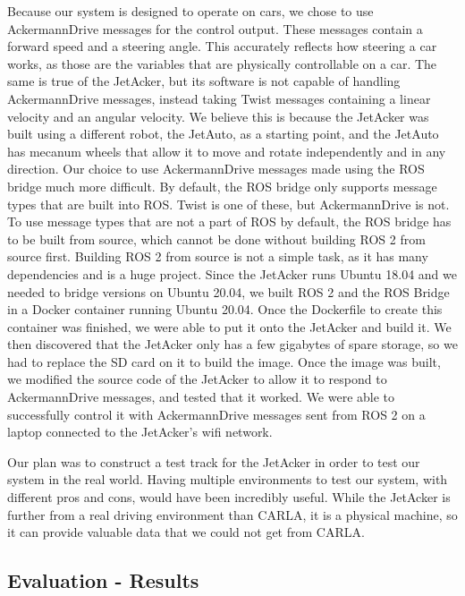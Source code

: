\documentclass[titlepage,draft]{article}
\begin{document}
{Because our system is designed to operate on cars, we chose to use AckermannDrive messages for the control output. These messages contain a forward speed and a steering angle. This accurately reflects how steering a car works, as those are the variables that are physically controllable on a car. The same is true of the JetAcker, but its software is not capable of handling AckermannDrive messages, instead taking Twist messages containing a linear velocity and an angular velocity. We believe this is because the JetAcker was built using a different robot, the JetAuto, as a starting point, and the JetAuto has mecanum wheels that allow it to move and rotate independently and in any direction. Our choice to use AckermannDrive messages made using the ROS bridge much more difficult. By default, the ROS bridge only supports message types that are built into ROS. Twist is one of these, but AckermannDrive is not. To use message types that are not a part of ROS by default, the ROS bridge has to be built from source, which cannot be done without building ROS 2 from source first. Building ROS 2 from source is not a simple task, as it has many dependencies and is a huge project. Since the JetAcker runs Ubuntu 18.04 and we needed to bridge versions on Ubuntu 20.04, we built ROS 2 and the ROS Bridge in a Docker container running Ubuntu 20.04. Once the Dockerfile to create this container was finished, we were able to put it onto the JetAcker and build it. We then discovered that the JetAcker only has a few gigabytes of spare storage, so we had to replace the SD card on it to build the image. Once the image was built, we modified the source code of the JetAcker to allow it to respond to AckermannDrive messages, and tested that it worked. We were able to successfully control it with AckermannDrive messages sent from ROS 2 on a laptop connected to the JetAcker's wifi network.

Our plan was to construct a test track for the JetAcker in order to test our system in the real world. Having multiple environments to test our system, with different pros and cons, would have been incredibly useful. While the JetAcker is further from a real driving environment than CARLA, it is a physical machine, so it can provide valuable data that we could not get from CARLA.

\subsection{Evaluation - Results}

}
\end{document}
